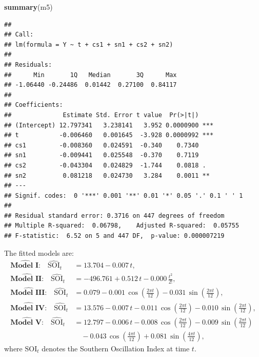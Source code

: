 \documentclass[
  10pt,
]{extarticle}
\newenvironment{Shaded}{\begin{snugshade}}{\end{snugshade}}
\newcommand{\FunctionTok}[1]{\textcolor[rgb]{0.13,0.29,0.53}{\textbf{#1}}}
\newcommand{\NormalTok}[1]{#1}
\begin{document}
\begin{Shaded}
\begin{Highlighting}[]
\FunctionTok{summary}\NormalTok{(m5)}
\end{Highlighting}
\end{Shaded}

\begin{verbatim}
## 
## Call:
## lm(formula = Y ~ t + cs1 + sn1 + cs2 + sn2)
## 
## Residuals:
##      Min       1Q   Median       3Q      Max 
## -1.06440 -0.24486  0.01442  0.27100  0.84117 
## 
## Coefficients:
##              Estimate Std. Error t value  Pr(>|t|)    
## (Intercept) 12.797341   3.238141   3.952 0.0000900 ***
## t           -0.006460   0.001645  -3.928 0.0000992 ***
## cs1         -0.008360   0.024591  -0.340    0.7340    
## sn1         -0.009441   0.025548  -0.370    0.7119    
## cs2         -0.043304   0.024829  -1.744    0.0818 .  
## sn2          0.081218   0.024730   3.284    0.0011 ** 
## ---
## Signif. codes:  0 '***' 0.001 '**' 0.01 '*' 0.05 '.' 0.1 ' ' 1
## 
## Residual standard error: 0.3716 on 447 degrees of freedom
## Multiple R-squared:  0.06798,    Adjusted R-squared:  0.05755 
## F-statistic:  6.52 on 5 and 447 DF,  p-value: 0.000007219
\end{verbatim}

The fitted models are:
\begin{align*}
\widehat{\textbf{Model I:}}\quad
\widehat{\text{SOI}}_t
&= 13.704 - 0.007\,t,\\[4pt]
\widehat{\textbf{Model II:}}\quad
\widehat{\text{SOI}}_t
&= -496.761 + 0.512\,t - 0.000\,\frac{t^2}{2!},\\[4pt]
\widehat{\textbf{Model III:}}\quad
\widehat{\text{SOI}}_t
&= 0.079 - 0.001\,\cos\!\left(\frac{2\pi t}{12}\right) - 0.031\,\sin\!\left(\frac{2\pi t}{12}\right),\\[4pt]
\widehat{\textbf{Model IV:}}\quad
\widehat{\text{SOI}}_t
&= 13.576 - 0.007\,t - 0.011\,\cos\!\left(\frac{2\pi t}{12}\right) - 0.010\,\sin\!\left(\frac{2\pi t}{12}\right),\\[4pt]
\widehat{\textbf{Model V:}}\quad
\widehat{\text{SOI}}_t
&= 12.797 - 0.006\,t - 0.008\,\cos\!\left(\frac{2\pi t}{12}\right) - 0.009\,\sin\!\left(\frac{2\pi t}{12}\right)\\
&\quad - 0.043\,\cos\!\left(\frac{4\pi t}{12}\right) + 0.081\,\sin\!\left(\frac{4\pi t}{12}\right),
\end{align*}
where \(\text{SOI}_t\) denotes the Southern Oscillation Index at time \(t\).

\newpage
\end{document}
